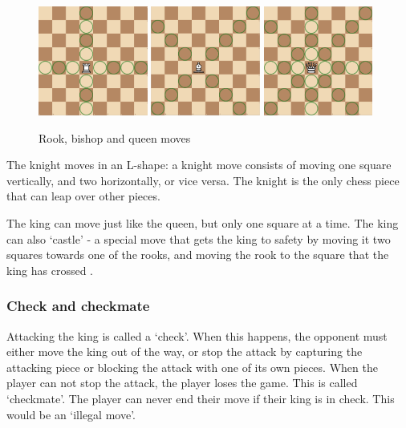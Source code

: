 \documentclass{article}
\begin{document}
\begin{figure}[H]
    \centering
    \includegraphics[width=0.32\textwidth]{img/rook.png}
    \includegraphics[width=0.32\textwidth]{img/bishop.png}
    \includegraphics[width=0.32\textwidth]{img/queen.png}
    \caption{Rook, bishop and queen moves}
\end{figure}


The knight moves in an L-shape: a knight move consists of moving one square vertically, and two horizontally, or vice versa.
The knight is the only chess piece that can leap over other pieces.

The king can move just like the queen, but only one square at a time. 
The king can also `castle' - a special move that gets the king to safety by moving it two squares towards one 
of the rooks, and moving the rook to the square that the king has crossed \cite{Castling2022}.


\subsubsection{Check and checkmate}

Attacking the king is called a `check'. When this happens, the opponent must either move the king out of the way, or
stop the attack by capturing the attacking piece or blocking the attack with one of its own pieces. 
When the player can not stop the attack, the player loses the game. This is called `checkmate'.
The player can never end their move if their king is in check. This would be an `illegal move'.
\end{document}
